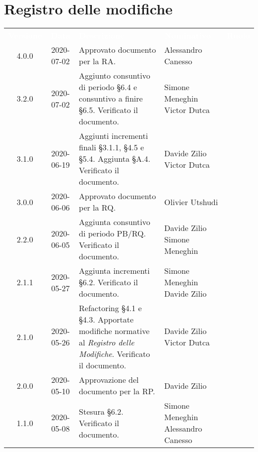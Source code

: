 \section*{Registro delle modifiche}
{
	\centering
	\begin{longtable}{ c c  C{4cm}  C{4cm}  C{3cm} }
		\textcolor{white}{\textbf{Versione}} & \textcolor{white}{\textbf{Data}} & \textcolor{white}{\textbf{Descrizione}} & \textcolor{white}{\textbf{Nominativo}} & \textcolor{white}{\textbf{Ruolo}}\\	
		4.0.0 & 2020-07-02 & Approvato documento per la RA. & Alessandro Canesso & \RdP{} \\ 
		3.2.0 & 2020-07-02 & Aggiunto consuntivo di periodo \S 6.4 e consuntivo a finire \S 6.5. Verificato il documento. & Simone Meneghin \newline Victor Dutca & \Res{} \newline \ver{} \\
		3.1.0 & 2020-06-19 & Aggiunti incrementi finali \S 3.1.1, \S 4.5 e \S 5.4. Aggiunta \S A.4. Verificato il documento. & Davide Zilio \newline Victor Dutca & \Res{} \newline \ver{} \\
		3.0.0 & 2020-06-06 & Approvato documento per la RQ. & Olivier Utshudi & \RdP{} \\
		2.2.0 & 2020-06-05 & Aggiunta consuntivo di periodo PB/RQ. Verificato il documento. & Davide Zilio \newline Simone Meneghin & \Res{} \newline \ver{} \\	
		2.1.1 & 2020-05-27 & Aggiunta incrementi \S 6.2. Verificato il documento. & Simone Meneghin \newline Davide Zilio &\adm{} \newline \ver{} \\
		2.1.0 & 2020-05-26 & Refactoring \S 4.1 e \S 4.3. Apportate modifiche normative al \textit{Registro delle Modifiche}. Verificato il documento. & Davide Zilio \newline Victor Dutca & \adm{} \newline \ver{} \\
		2.0.0 & 2020-05-10 & Approvazione del documento per la RP. & Davide Zilio &\RdP{} \\
		1.1.0 & 2020-05-08 & Stesura \S 6.2. Verificato il documento. & Simone Meneghin \newline Alessandro Canesso &\adm{} \newline \ver{}\\

\end{longtable}}

